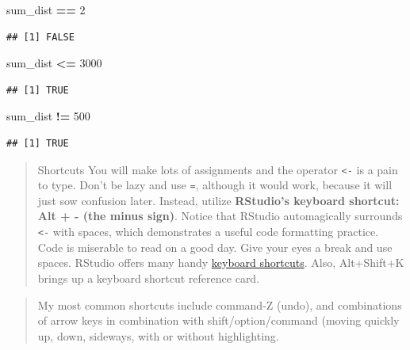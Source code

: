 \documentclass[]{book}
\newenvironment{Shaded}{\begin{snugshade}}{\end{snugshade}}
\newcommand{\DecValTok}[1]{\textcolor[rgb]{0.00,0.00,0.81}{#1}}
\newcommand{\NormalTok}[1]{#1}
\newcommand{\OperatorTok}[1]{\textcolor[rgb]{0.81,0.36,0.00}{\textbf{#1}}}
\newcommand{\StringTok}[1]{\textcolor[rgb]{0.31,0.60,0.02}{#1}}
\begin{document}
\begin{Shaded}
\begin{Highlighting}[]
\NormalTok{sum_dist }\OperatorTok{==}\StringTok{ }\DecValTok{2}
\end{Highlighting}
\end{Shaded}

\begin{verbatim}
## [1] FALSE
\end{verbatim}

\begin{Shaded}
\begin{Highlighting}[]
\NormalTok{sum_dist }\OperatorTok{<=}\StringTok{ }\DecValTok{3000}
\end{Highlighting}
\end{Shaded}

\begin{verbatim}
## [1] TRUE
\end{verbatim}

\begin{Shaded}
\begin{Highlighting}[]
\NormalTok{sum_dist }\OperatorTok{!=}\StringTok{ }\DecValTok{500}
\end{Highlighting}
\end{Shaded}

\begin{verbatim}
## [1] TRUE
\end{verbatim}

\begin{quote}
Shortcuts
You will make lots of assignments and the operator \texttt{\textless{}-} is a pain to type. Don't be lazy and use \texttt{=}, although it would work, because it will just sow confusion later. Instead, utilize \textbf{RStudio's keyboard shortcut: Alt + - (the minus sign)}.
Notice that RStudio automagically surrounds \texttt{\textless{}-} with spaces, which demonstrates a useful code formatting practice. Code is miserable to read on a good day. Give your eyes a break and use spaces.
RStudio offers many handy \href{https://support.rstudio.com/hc/en-us/articles/200711853-Keyboard-Shortcuts}{keyboard shortcuts}. Also, Alt+Shift+K brings up a keyboard shortcut reference card.
\end{quote}

\begin{quote}
My most common shortcuts include command-Z (undo), and combinations of arrow keys in combination with shift/option/command (moving quickly up, down, sideways, with or without highlighting.
\end{quote}
\end{document}

